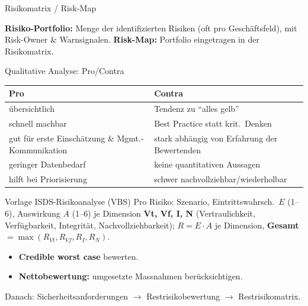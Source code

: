 \documentclass[a4paper, fontsize=7pt]{scrartcl}
\renewcommand*{\arraystretch}{1.5}  %
\begin{document}
\begin{mainbox}{Risikomatrix / Risk-Map}
\begin{center}
\end{center}
\textbf{Risiko-Portfolio:} Menge der identifizierten Risiken (oft pro
Geschäftsfeld), mit Risk-Owner \& Warnsignalen.
\textbf{Risk-Map:} Portfolio eingetragen in der Risikomatrix.
\end{mainbox}

\begin{subbox}{Qualitative Analyse: Pro/Contra}
\renewcommand*{\arraystretch}{1.15}
\begin{tabularx}{\linewidth}{@{}X|X@{}}
\textbf{Pro} & \textbf{Contra} \\
\hline
übersichtlich & Tendenz zu ``alles gelb'' \\
schnell machbar & Best Practice statt krit.\ Denken \\
gut für erste Einschätzung \& Mgmt.-Kommunikation & stark abhängig von
Erfahrung der Bewertenden \\
geringer Datenbedarf & keine quantitativen Aussagen \\
hilft bei Priorisierung & schwer nachvollziehbar/wiederholbar \\
\end{tabularx}
\end{subbox}

\begin{subbox}{Vorlage ISDS-Risikoanalyse (VBS)}
Pro Risiko: Szenario, Eintrittswahrsch.\ $E$ (1--6), Auswirkung $A$ (1--6)
je Dimension \textbf{Vt, Vf, I, N} (Vertraulichkeit, Verfügbarkeit,
Integrität, Nachvollziehbarkeit); $R = E \cdot A$ je Dimension,
\textbf{Gesamt} $= \max(R_{Vt}, R_{Vf}, R_I, R_N)$.
\begin{itemize}
    \item \textbf{Credible worst case} bewerten.
    \item \textbf{Nettobewertung:} umgesetzte Massnahmen berücksichtigen.
\end{itemize}
Danach: Sicherheitsanforderungen $\to$ Restrisikobewertung $\to$
Restrisikomatrix.
\end{subbox}
\end{document}
